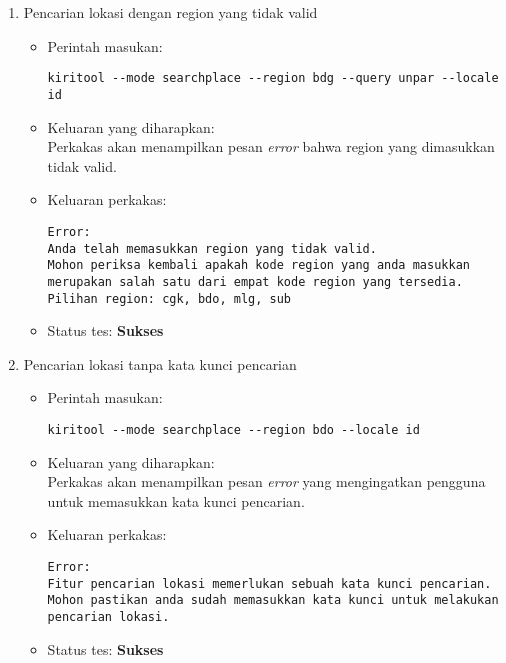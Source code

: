 \begin{enumerate}
	\item Pencarian lokasi dengan region yang tidak valid
	\begin{itemize}
		\item Perintah masukan:
		\begin{lstlisting}
kiritool --mode searchplace --region bdg --query unpar --locale id
		\end{lstlisting}
		\item Keluaran yang diharapkan: \\
		Perkakas akan menampilkan pesan \textit{error} bahwa region yang dimasukkan tidak valid.
		\item Keluaran perkakas:
		\begin{lstlisting}
Error:
Anda telah memasukkan region yang tidak valid.
Mohon periksa kembali apakah kode region yang anda masukkan merupakan salah satu dari empat kode region yang tersedia.
Pilihan region: cgk, bdo, mlg, sub
		\end{lstlisting}
		\item Status tes: \textbf{Sukses}
	\end{itemize}
	
	\item Pencarian lokasi tanpa kata kunci pencarian
	\begin{itemize}
		\item Perintah masukan:
		\begin{lstlisting}
kiritool --mode searchplace --region bdo --locale id
		\end{lstlisting}
		\item Keluaran yang diharapkan: \\
		Perkakas akan menampilkan pesan \textit{error} yang mengingatkan pengguna untuk memasukkan kata kunci pencarian.
		\item Keluaran perkakas:
		\begin{lstlisting}
Error:
Fitur pencarian lokasi memerlukan sebuah kata kunci pencarian.
Mohon pastikan anda sudah memasukkan kata kunci untuk melakukan pencarian lokasi.
		\end{lstlisting}
		\item Status tes: \textbf{Sukses}
	\end{itemize}
	

\end{enumerate}
